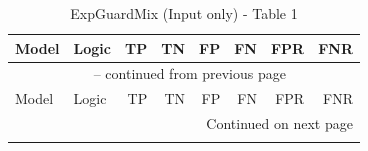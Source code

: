 \documentclass{article}
\begin{document}
{\small
\begin{longtable}{llrrrrrr}
\caption{ExpGuardMix (Input only) - Table 1} \label{tab:5models} \\
 
\toprule
Model & Logic & TP & TN & FP & FN & FPR & FNR \\
\midrule
\endfirsthead
 
\multicolumn{8}{c}{\tablename\ \thetable{} -- continued from previous page} \\
\toprule
Model & Logic & TP & TN & FP & FN & FPR & FNR \\
\midrule
\endhead
 
\midrule
\multicolumn{8}{r}{Continued on next page} \\
\endfoot
 
\bottomrule
\endlastfoot


\end{longtable}}
\end{document}
